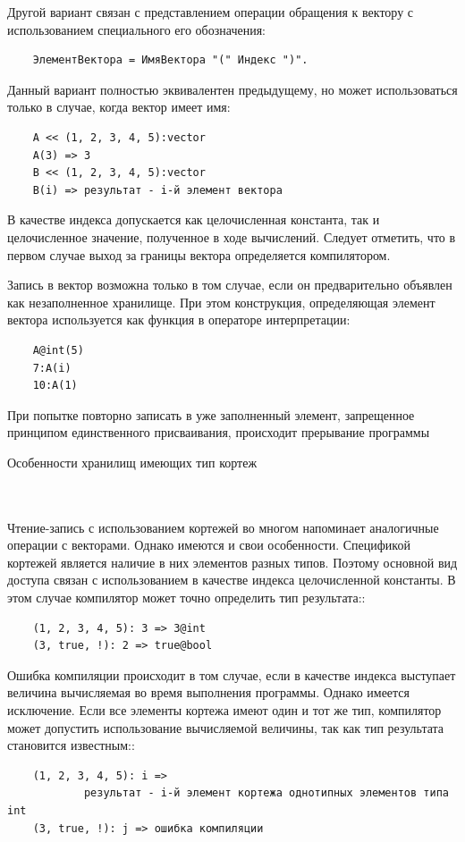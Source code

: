 Другой вариант связан с представлением операции обращения к вектору с использованием специального его обозначения:
\begin{verbatim}
    ЭлементВектора = ИмяВектора "(" Индекс ")".
\end{verbatim}


Данный вариант полностью эквивалентен предыдущему, но может использоваться только в случае, когда вектор имеет имя:
\begin{verbatim}
    A << (1, 2, 3, 4, 5):vector
    A(3) => 3
    B << (1, 2, 3, 4, 5):vector
    B(i) => результат - i-й элемент вектора
\end{verbatim}
В качестве индекса допускается как целочисленная константа, так и целочисленное значение, полученное в ходе вычислений. Следует отметить, что в первом случае выход за границы вектора определяется компилятором.

Запись в вектор возможна только в том случае, если он предварительно объявлен как незаполненное хранилище. При этом конструкция, определяющая элемент вектора используется как функция в операторе интерпретации:
\begin{verbatim}
    A@int(5)
    7:A(i)
    10:A(1)
\end{verbatim}
При попытке повторно записать в уже заполненный элемент, запрещенное принципом единственного присваивания, происходит прерывание программы

Особенности хранилищ имеющих тип кортеж
~~~~~~~~~~~~~~~~~~~~~~~~~~~~~~~~~~~~~~~~~~~~~~~~~~~~~~~~~~~~~~~~~~~~~~~~~~~~~~

Чтение-запись с использованием кортежей во многом напоминает аналогичные операции с векторами. Однако имеются и свои особенности. Спецификой кортежей является наличие в них элементов разных типов. Поэтому основной вид доступа связан с использованием в качестве индекса целочисленной константы. В этом случае компилятор может точно определить тип результата::
\begin{verbatim}
    (1, 2, 3, 4, 5): 3 => 3@int
    (3, true, !): 2 => true@bool
\end{verbatim}

Ошибка компиляции происходит в том случае, если в качестве индекса выступает величина вычисляемая во время выполнения программы. Однако имеется исключение. Если все элементы кортежа имеют один и тот же тип, компилятор может допустить использование вычисляемой величины, так как тип результата становится известным::
\begin{verbatim}
    (1, 2, 3, 4, 5): i =>
            результат - i-й элемент кортежа однотипных элементов типа int
    (3, true, !): j => ошибка компиляции
\end{verbatim}

